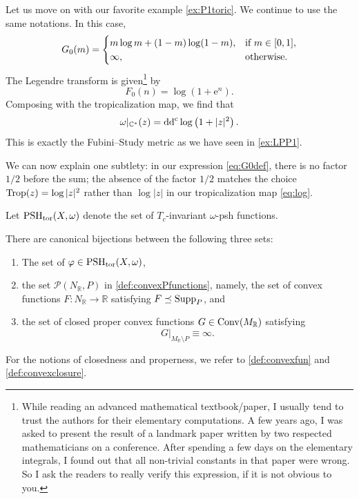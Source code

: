 \begin{example}\label{ex:P1toric1}
Let us move on with our favorite example \cref{ex:P1toric}. We continue to use the same notations. In this case,
\[
G_0(m)=
\begin{cases}
    m\log m+(1-m)\log (1-m),& \textup{if } m\in [0,1],\\
    \infty,&\textup{otherwise}.
\end{cases}
\]
The Legendre transform is given\footnote{While reading an advanced mathematical textbook/paper, I usually tend to trust the authors for their elementary computations. A few years ago, I was asked to present the result of a landmark paper written by two respected mathematicians on a conference. After spending a few days on the elementary integrals, I found out that all non-trivial constants in that paper were wrong. So I ask the readers to really verify this expression, if it is not obvious to you.} by
\[
F_0(n)=\log\left(1+\mathrm{e}^n\right).
\]
Composing with the tropicalization map, we find that
\[
\omega|_{\mathbb{C}^*}(z)=\mathrm{dd}^{\mathrm{c}}\log\left(1+|z|^2\right).
\]
This is exactly the Fubini--Study metric as we have seen in \cref{ex:LPP1}.

We can now explain one subtlety: in our expression \eqref{eq:G0def}, there is no factor $1/2$ before the sum; the absence of the factor $1/2$ matches the choice $\operatorname{Trop}(z)=\log|z|^2$ rather than $\log|z|$ in our tropicalization map \eqref{eq:log}.
\end{example}


Let $\mathrm{PSH}_{\mathrm{tor}}(X,\omega)$ denote the set of $T_c$-invariant $\omega$-psh functions.
\begin{theorem}\label{thm:toricpsh}
    There are canonical bijections between the following three sets:
    \begin{enumerate}
        \item\label{itm:thm:toricpsh:1} The set of $\varphi\in \mathrm{PSH}_{\mathrm{tor}}(X,\omega)$,
        \item\label{itm:thm:toricpsh:2} the set $\mathcal{P}(N_{\mathbb{R}},P)$ in \cref{def:convexPfunctions}, namely, the set of convex functions $F\colon N_{\mathbb{R}}\rightarrow \mathbb{R}$ satisfying $F\preceq \operatorname{Supp}_P$, and
        \item\label{itm:thm:toricpsh:3} the set of closed proper convex functions $G\in \mathrm{Conv}(M_{\mathbb{R}})$ satisfying
        \[
        G|_{M_{\mathbb{R}}\setminus P}\equiv \infty.
        \]
    \end{enumerate}
\end{theorem}
For the notions of closedness and properness, we refer to \cref{def:convexfun} and \cref{def:convexclosure}.

